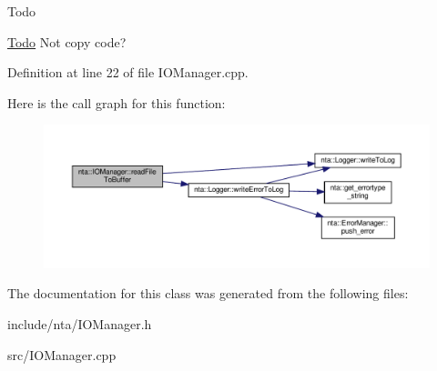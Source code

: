 \begin{DoxyRefDesc}{Todo}
\item[\hyperlink{todo__todo000010}{Todo}]Not copy code? \end{DoxyRefDesc}


Definition at line 22 of file I\+O\+Manager.\+cpp.

Here is the call graph for this function\+:
\nopagebreak
\begin{figure}[H]
\begin{center}
\leavevmode
\includegraphics[width=350pt]{d2/d54/classnta_1_1IOManager_abbfd9da05b22aa488043a19344d38e0a_cgraph}
\end{center}
\end{figure}


The documentation for this class was generated from the following files\+:\begin{DoxyCompactItemize}
\item 
include/nta/I\+O\+Manager.\+h\item 
src/I\+O\+Manager.\+cpp\end{DoxyCompactItemize}
